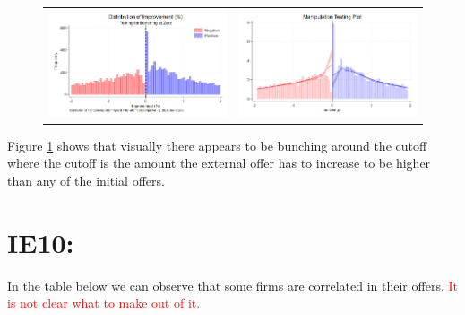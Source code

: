 \documentclass[12pt]{article}
\begin{document}
\begin{figure}[H]
\caption{}
\label{fig:ie7_3}
\centering{}%
\begin{tabular}{cc}
\includegraphics[scale=0.3]{../figures/IE7/IE7_hist_bunching_max(2).png} & \includegraphics[scale=0.3]{../figures/IE7/IE7_rd_bunching_max(2).png}
\end{tabular}
\end{figure}

Figure \ref{fig:ie7_3} shows that visually there appears to be bunching around the cutoff where the cutoff is the amount the external offer has to increase to be higher than any of the initial offers. 



\newpage

\section{IE10: }



In the table below we can observe that some firms are correlated in their offers. 
\textcolor{red}{It is not clear what to make out of it.}
\end{document}
